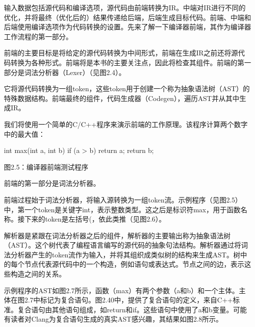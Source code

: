 
输入数据包括源代码和编译选项，源代码由前端转换为IR。中端对IR进行不同的优化，并将最终（优化后的）结果传递给后端，后端生成目标代码。前端、中端和后端使用编译选项作为代码转换的设置。先来了解一下编译器前端，其作为编译器工作流程的第一部分。


前端的主要目标是将给定的源代码转换为中间形式，前端在生成IR之前还将源代码转换为各种形式。前端将是本书的主要关注点，因此将检查其组件。前端的第一部分是词法分析器（Lexer）（见图2.4）。


它将源代码转换为一组token，这些token用于创建一个称为抽象语法树（AST）的特殊数据结构。前端最终的组件，代码生成器（Codegen），遍历AST并从其中生成IR。

我们将使用一个简单的C/C++程序来演示前端的工作原理。该程序计算两个数字中的最大值：

\begin{cpp}
int max(int a, int b) {
  if (a > b)
    return a;
  return b;
}
\end{cpp}

\begin{center}
图2.5：编译器前端测试程序
\end{center}

前端的第一部分是词法分析器。


前端过程始于词法分析器，将输入源转换为一组token流。示例程序（见图2.5）中，第一个token是关键字int，表示整数类型。这之后是标识符max，用于函数名称。接下来的token是左括号(，依此类推（见图2.6）。



解析器是紧跟在词法分析器之后的组件，解析器的主要输出称为抽象语法树（AST）。这个树代表了编程语言编写的源代码的抽象句法结构。解析器通过将词法分析器产生的token流作为输入，并将其组织成类似树的结构来生成AST。树中的每个节点代表源代码中的一个构造，例如语句或表达式。节点之间的边，表示这些构造之间的关系。


示例程序的AST如图2.7所示，函数（max）有两个参数（a和b）和一个主体。主体在图2.7中标记为复合语句。图2.40中，提供了复合语句的定义，来自C++标准。复合语句由其他语句组成，如return和if。这些语句中使用了a和b变量。可能有读者对Clang为复合语句生成的真实AST感兴趣，其结果如图2.8所示。

